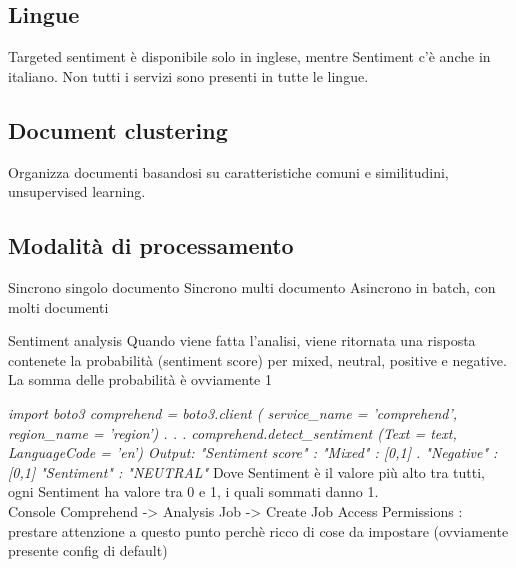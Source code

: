 \documentclass{classes/base}
\begin{document}
    \subsection*{Lingue}
    Targeted sentiment è disponibile solo in inglese, mentre Sentiment c'è anche in italiano. 
    Non tutti i servizi sono presenti in tutte le lingue.

    \subsection*{Document clustering}
    Organizza documenti basandosi su caratteristiche comuni e similitudini, unsupervised learning.

    \subsection*{Modalità di processamento}
    Sincrono singolo documento
    Sincrono multi documento
    Asincrono in batch, con molti documenti

    Sentiment analysis
    Quando viene fatta l’analisi, viene ritornata una risposta contenete la probabilità (sentiment score) per mixed, neutral, positive e negative. La somma delle probabilità è ovviamente 1

    \textit{import boto3
    comprehend = boto3.client ( service_name = 'comprehend',
                                                region_name = 'region')
    .
    .
    .
    comprehend.detect_sentiment (Text = text, LanguageCode = 'en')
    Output:
    "Sentiment score" : {
                "Mixed" : [0,1]
                .                          
                "Negative" : [0,1]
                }
    "Sentiment" : "NEUTRAL"}
    Dove Sentiment è il valore più alto tra tutti, ogni Sentiment ha valore tra 0 e 1, i quali sommati danno 1.\\
    
    Console
    Comprehend -> Analysis Job -> Create Job
    Access Permissions : prestare attenzione a questo punto perchè ricco di cose da impostare (ovviamente presente config di default)
\end{document}
